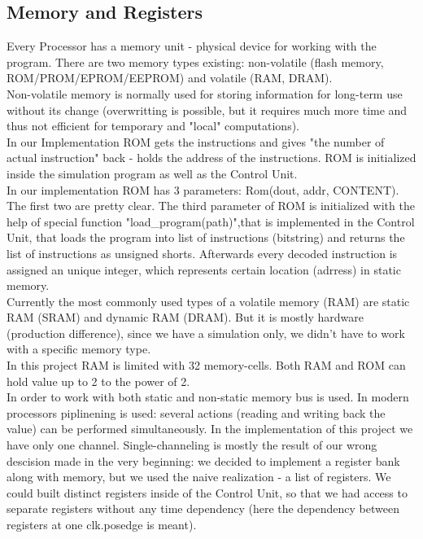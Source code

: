 \documentclass[11pt,a4paper]{article}
\begin{document}
\subsection{Memory and Registers}
Every Processor has a memory unit - physical device for working with the program. There are two memory types existing: non-volatile (flash memory,  ROM/PROM/EPROM/EEPROM) and volatile (RAM, DRAM).\\
Non-volatile memory is normally used for storing information for long-term use without its change (overwritting is possible, but it requires much more time and thus not efficient for temporary and "local" computations).\\
In our Implementation ROM gets the instructions and gives "the number of actual instruction" back - holds the address of the instructions. ROM is initialized inside the simulation program as well as the Control Unit.\\
In our implementation ROM has 3 parameters: Rom(dout, addr, CONTENT). The first two are pretty clear. The third parameter of ROM is initialized with the help of special function "load\_program(path)",that is implemented in the Control Unit, that loads the program into list of instructions (bitstring) and returns the list of instructions as unsigned shorts. Afterwards every decoded instruction is assigned an  unique integer, which represents certain location (adrress) in static memory.\\
Currently the most commonly used types of a volatile memory (RAM) are static RAM (SRAM) and dynamic RAM (DRAM). But it is mostly hardware (production difference), since we have a simulation only, we didn't have to work with a specific memory type.\\
In this project RAM is limited with 32 memory-cells. Both RAM and ROM can hold value up to 2 to the power of 2. \\
In order to  work with both static and non-static memory bus is used. In modern processors piplinening is used: several actions (reading and writing back the value) can be performed simultaneously.
In the implementation of this project we have only one channel. Single-channeling is mostly the result of our wrong descision made in the very beginning: we decided to implement a register bank along with memory, but we used the naive realization - a list of registers. We could built distinct registers inside of the Control Unit, so that we had access to separate registers without any time dependency (here the dependency between registers at one clk.posedge is meant).\\ 
\end{document}
